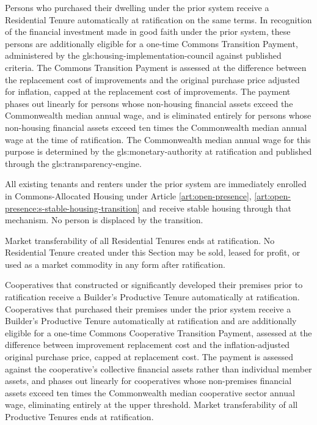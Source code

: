 Persons who purchased their dwelling under the prior system receive a Residential Tenure automatically at ratification on the same terms. In recognition of the financial investment made in good faith under the prior system, these persons are additionally eligible for a one-time Commons Transition Payment, administered by the \gls{gls:housing-implementation-council} against published criteria. The Commons Transition Payment is assessed at the difference between the replacement cost of improvements and the original purchase price adjusted for inflation, capped at the replacement cost of improvements. The payment phases out linearly for persons whose non-housing financial assets exceed the Commonwealth median annual wage, and is eliminated entirely for persons whose non-housing financial assets exceed ten times the Commonwealth median annual wage at the time of ratification. The Commonwealth median annual wage for this purpose is determined by the \gls{gls:monetary-authority} at ratification and published through the \gls{gls:transparency-engine}.

All existing tenants and renters under the prior system are immediately enrolled in Commons-Allocated Housing under Article \ref{art:open-presence}, \ref{art:open-presence:s-stable-housing-transition} and receive stable housing through that mechanism. No person is displaced by the transition.

Market transferability of all Residential Tenures ends at ratification. No Residential Tenure created under this Section may be sold, leased for profit, or used as a market commodity in any form after ratification.

Cooperatives that constructed or significantly developed their premises prior to ratification receive a Builder's Productive Tenure automatically at ratification. Cooperatives that purchased their premises under the prior system receive a Builder's Productive Tenure automatically at ratification and are additionally eligible for a one-time Commons Cooperative Transition Payment, assessed at the difference between improvement replacement cost and the inflation-adjusted original purchase price, capped at replacement cost. The payment is assessed against the cooperative's collective financial assets rather than individual member assets, and phases out linearly for cooperatives whose non-premises financial assets exceed ten times the Commonwealth median cooperative sector annual wage, eliminating entirely at the upper threshold. Market transferability of all Productive Tenures ends at ratification.

